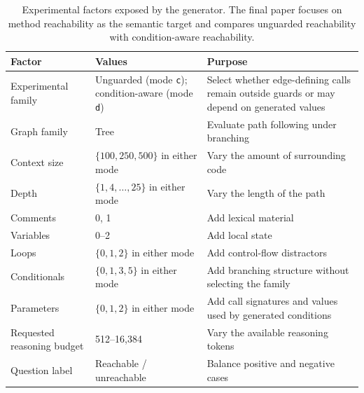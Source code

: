 \begin{table}[t]
\centering
\caption{Experimental factors exposed by the generator. The final paper focuses on method reachability as the semantic target and compares unguarded reachability with condition-aware reachability.}
\label{tab:experimental-factors}
\begin{tabularx}{\textwidth}{p{}p{}X}
\toprule
Factor & Values & Purpose \\
\midrule
Experimental family & Unguarded (mode \texttt{c}); condition-aware (mode \texttt{d}) & Select whether edge-defining calls remain outside guards or may depend on generated values \\
Graph family & Tree & Evaluate path following under branching \\
Context size & $\{100,250,500\}$ in either mode & Vary the amount of surrounding code \\
Depth & $\{1,4,\ldots,25\}$ in either mode & Vary the length of the path \\
Comments & 0, 1 & Add lexical material \\
Variables & 0--2 & Add local state \\
Loops & $\{0,1,2\}$ in either mode & Add control-flow distractors \\
Conditionals & $\{0,1,3,5\}$ in either mode & Add branching structure without selecting the family \\
Parameters & $\{0,1,2\}$ in either mode & Add call signatures and values used by generated conditions \\
Requested reasoning budget & 512--16,384 & Vary the available reasoning tokens \\
Question label & Reachable / unreachable & Balance positive and negative cases \\
\bottomrule
\end{tabularx}
\end{table}
